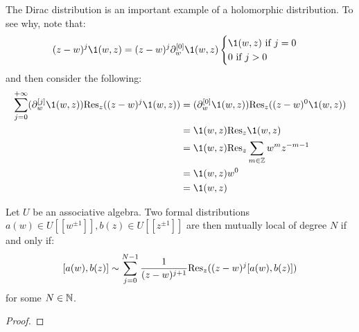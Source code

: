         \begin{example} \label{example: laurent_series_expansion_of_dirac_distribution}
            The Dirac distribution is an important example of a holomorphic distribution. To see why, note that:
                $$
                    (z - w)^j \1(w, z) = (z - w)^j \del_w^{[0]} \1(w, z)
                    \begin{cases}
                        \text{$\1(w, z)$ if $j = 0$}
                        \\
                        \text{$0$ if $j > 0$}
                    \end{cases}
                $$
            and then consider the following:
                $$
                    \begin{aligned}
                        \sum_{j = 0}^{+\infty} ( \del_w^{[j]} \1(w, z) ) \Res_z( (z - w)^j \1(w, z) ) & = ( \del_w^{[0]} \1(w, z) ) \Res_z( (z - w)^0 \1(w, z) )
                        \\
                        & =  \1(w, z) \Res_z \1(w, z)
                        \\
                        & = \1(w, z) \Res_z \sum_{m \in \Z} w^m z^{-m - 1}
                        \\
                        & = \1(w, z) w^0
                        \\
                        & = \1(w, z)
                    \end{aligned}
                $$
            
        \end{example}
            
        \begin{proposition} \label{prop: commutator_OPEs_for_mutually_local_distributions}
            Let $U$ be an associative algebra. Two formal distributions $a(w) \in U[\![w^{\pm 1}]\!], b(z) \in U[\![z^{\pm 1}]\!]$ are then mutually local of degree $N$ if and only if:
                $$[a(w), b(z)] \sim \sum_{j = 0}^{N - 1} \frac{1}{(z - w)^{j + 1}} \mathrm{Res}_z( (z - w)^j [a(w), b(z)] )$$
            for some $N \in \mathbb{N}$.
        \end{proposition}
            \begin{proof}
                
            \end{proof}